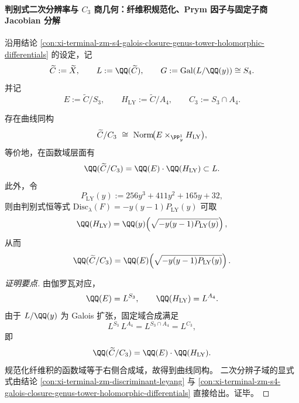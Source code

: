 \paragraph{判别式二次分辨率与 \texorpdfstring{$C_3$}{C3} 商几何：纤维积规范化、Prym 因子与固定子商 Jacobian 分解}
沿用结论 \ref{con:xi-terminal-zm-s4-galois-closure-genus-tower-holomorphic-differentials} 的设定，记
\[
\widetilde{C}:=\widetilde{X},\qquad
L:=\QQ(\widetilde{C}),\qquad
G:=\mathrm{Gal}(L/\QQ(y))\cong S_4.
\]
并记
\[
E:=\widetilde{C}/S_3,\qquad
H_{\mathrm{LY}}:=\widetilde{C}/A_4,\qquad
C_3:=S_3\cap A_4.
\]

\begin{conclusion}\label{con:xi-terminal-zm-s4-c3-fiberproduct-normalization}
存在曲线同构
\[
\widetilde{C}/C_3\ \cong\ \mathrm{Norm}\!\bigl(E\times_{\PP^1_y}H_{\mathrm{LY}}\bigr),
\]
等价地，在函数域层面有
\[
\QQ(\widetilde{C}/C_3)=\QQ(E)\cdot \QQ(H_{\mathrm{LY}})\subset L.
\]
此外，令
\[
P_{\mathrm{LY}}(y):=256y^3+411y^2+165y+32,
\]
则由判别式恒等式 \(\mathrm{Disc}_{\lambda}(F)=-y(y-1)P_{\mathrm{LY}}(y)\) 可取
\[
\QQ(H_{\mathrm{LY}})=\QQ(y)\!\left(\sqrt{-y(y-1)P_{\mathrm{LY}}(y)}\right),
\]
从而
\[
\QQ(\widetilde{C}/C_3)=\QQ(E)\!\left(\sqrt{-y(y-1)P_{\mathrm{LY}}(y)}\right).
\]
\end{conclusion}
\begin{proof}[证明要点]
由伽罗瓦对应，
\[
\QQ(E)=L^{S_3},\qquad \QQ(H_{\mathrm{LY}})=L^{A_4}.
\]
由于 \(L/\QQ(y)\) 为 Galois 扩张，固定域合成满足
\[
L^{S_3}\,L^{A_4}=L^{S_3\cap A_4}=L^{C_3},
\]
即
\[
\QQ(\widetilde{C}/C_3)=\QQ(E)\cdot\QQ(H_{\mathrm{LY}}).
\]
规范化纤维积的函数域等于右侧合成域，故得到曲线同构。
二次分辨子域的显式式由结论 \ref{con:xi-terminal-zm-discriminant-leyang} 与
\ref{con:xi-terminal-zm-s4-galois-closure-genus-tower-holomorphic-differentials} 直接给出。证毕。
\end{proof}

